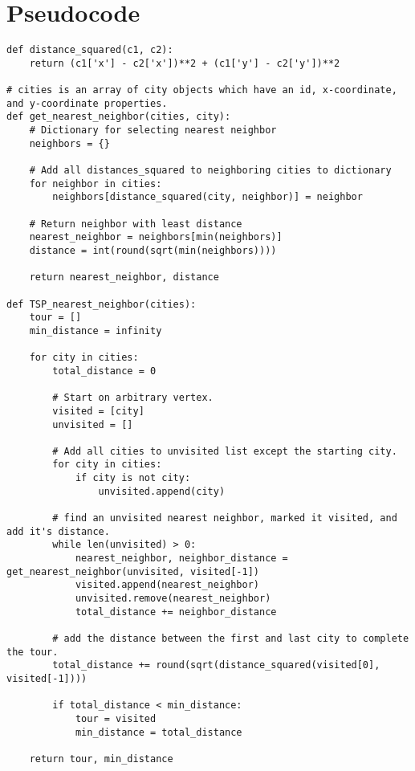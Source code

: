 \documentclass[Group45_Project_Report.tex]{subfiles}
\begin{document}
\section*{Pseudocode}
\newpage
\begin{verbatim}
def distance_squared(c1, c2):
	return (c1['x'] - c2['x'])**2 + (c1['y'] - c2['y'])**2

# cities is an array of city objects which have an id, x-coordinate, and y-coordinate properties.
def get_nearest_neighbor(cities, city):
	# Dictionary for selecting nearest neighbor
	neighbors = {}

	# Add all distances_squared to neighboring cities to dictionary
	for neighbor in cities:
		neighbors[distance_squared(city, neighbor)] = neighbor

	# Return neighbor with least distance
	nearest_neighbor = neighbors[min(neighbors)]
	distance = int(round(sqrt(min(neighbors))))

	return nearest_neighbor, distance

def TSP_nearest_neighbor(cities):
	tour = []
	min_distance = infinity
	
	for city in cities:
		total_distance = 0

		# Start on arbitrary vertex.
		visited = [city]
		unvisited = []

		# Add all cities to unvisited list except the starting city.
		for city in cities:
			if city is not city:
				unvisited.append(city)

		# find an unvisited nearest neighbor, marked it visited, and add it's distance.
		while len(unvisited) > 0:
			nearest_neighbor, neighbor_distance = get_nearest_neighbor(unvisited, visited[-1])
			visited.append(nearest_neighbor)
			unvisited.remove(nearest_neighbor)
			total_distance += neighbor_distance	

		# add the distance between the first and last city to complete the tour.
		total_distance += round(sqrt(distance_squared(visited[0], visited[-1])))

		if total_distance < min_distance:
			tour = visited
			min_distance = total_distance

	return tour, min_distance
\end{verbatim}
\end{document}
